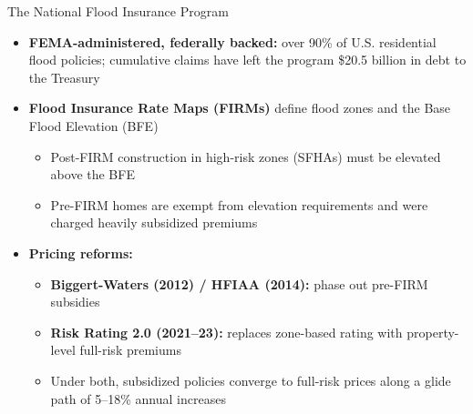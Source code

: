 \documentclass[serif, aspectratio=169, 10pt]{beamer}
\begin{document}
\begin{frame}{The National Flood Insurance Program}
\begin{itemize}
    \item \textbf{FEMA-administered, federally backed:} over 90\% of U.S. residential flood policies; cumulative claims have left the program \$20.5 billion in debt to the Treasury
    \item \textbf{Flood Insurance Rate Maps (FIRMs)} define flood zones and the Base Flood Elevation (BFE)
    \begin{itemize}
        \item Post-FIRM construction in high-risk zones (SFHAs) must be elevated above the BFE
        \item Pre-FIRM homes are exempt from elevation requirements and were charged heavily subsidized premiums
    \end{itemize}
    \item \textbf{Pricing reforms:}
    \begin{itemize}
        \item \textbf{Biggert-Waters (2012) / HFIAA (2014):} phase out pre-FIRM subsidies
        \item \textbf{Risk Rating 2.0 (2021--23):} replaces zone-based rating with property-level full-risk premiums
        \item Under both, subsidized policies converge to full-risk prices along a glide path of 5--18\% annual increases
    \end{itemize}
\end{itemize}
\end{frame}
\end{document}
